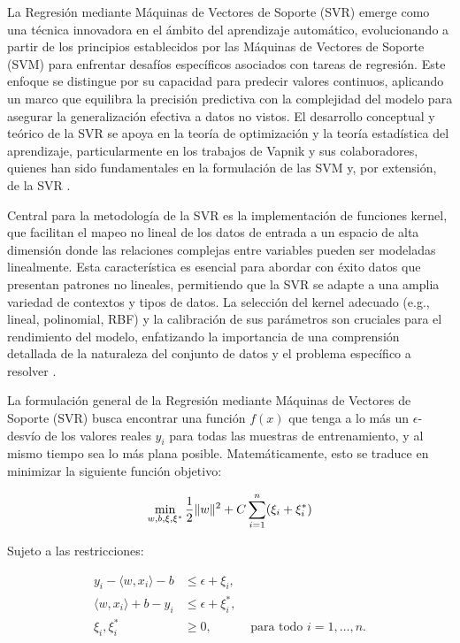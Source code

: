 \documentclass[
  11pt,
  bookmarksnumbered]{article}
\begin{document}
La Regresión mediante Máquinas de Vectores de Soporte (SVR) emerge como una técnica innovadora en el ámbito del aprendizaje automático, evolucionando a partir de los principios establecidos por las Máquinas de Vectores de Soporte (SVM) para enfrentar desafíos específicos asociados con tareas de regresión.
Este enfoque se distingue por su capacidad para predecir valores continuos, aplicando un marco que equilibra la precisión predictiva con la complejidad del modelo para asegurar la generalización efectiva a datos no vistos.
El desarrollo conceptual y teórico de la SVR se apoya en la teoría de optimización y la teoría estadística del aprendizaje, particularmente en los trabajos de Vapnik y sus colaboradores, quienes han sido fundamentales en la formulación de las SVM y, por extensión, de la SVR \textcite{Vapnik1995}.

Central para la metodología de la SVR es la implementación de funciones kernel, que facilitan el mapeo no lineal de los datos de entrada a un espacio de alta dimensión donde las relaciones complejas entre variables pueden ser modeladas linealmente.
Esta característica es esencial para abordar con éxito datos que presentan patrones no lineales, permitiendo que la SVR se adapte a una amplia variedad de contextos y tipos de datos.
La selección del kernel adecuado (e.g., lineal, polinomial, RBF) y la calibración de sus parámetros son cruciales para el rendimiento del modelo, enfatizando la importancia de una comprensión detallada de la naturaleza del conjunto de datos y el problema específico a resolver \textcite{ScholkopfSmola2002}.

La formulación general de la Regresión mediante Máquinas de Vectores de Soporte (SVR) busca encontrar una función \(f(x)\) que tenga a lo más un \(\epsilon\)-desvío de los valores reales \(y_i\) para todas las muestras de entrenamiento, y al mismo tiempo sea lo más plana posible.
Matemáticamente, esto se traduce en minimizar la siguiente función objetivo:


\begin{equation}
\large \min_{w, b, \xi, \xi^*} \frac{1}{2} \|w\|^2 + C \sum_{i=1}^{n} (\xi_i + \xi_i^*) \end{equation}

Sujeto a las restricciones:

\[
\begin{aligned}
y_i - \langle w, x_i \rangle - b &\leq \epsilon + \xi_i, \\
\langle w, x_i \rangle + b - y_i &\leq \epsilon + \xi_i^*, \\
\xi_i, \xi_i^* &\geq 0, &\text{ para todo } i = 1, \ldots, n.
\end{aligned}
\]
\end{document}
